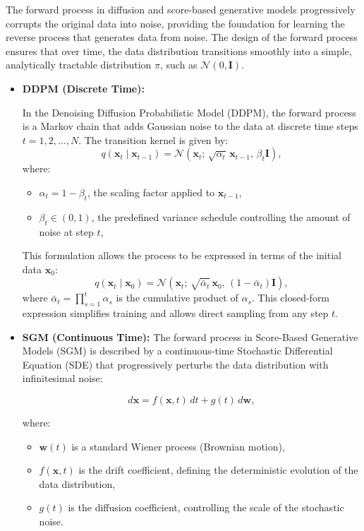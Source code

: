The forward process in diffusion and score-based generative models progressively corrupts the original data into noise, providing the foundation for learning the reverse process that generates data from noise. The design of the forward process ensures that over time, the data distribution transitions smoothly into a simple, analytically tractable distribution $\pi$, such as \( \mathcal{N}(0, \mathbf{I}) \).

\begin{itemize}
    \item \textbf{DDPM (Discrete Time):}
    
    In the Denoising Diffusion Probabilistic Model (DDPM), the forward process is a Markov chain that adds Gaussian noise to the data at discrete time steps \( t = 1, 2, \dots, N \). The transition kernel is given by:
    \[
    q(\mathbf{x}_t \mid \mathbf{x}_{t-1}) = \mathcal{N}\left(\mathbf{x}_t;\, \sqrt{\alpha_t} \, \mathbf{x}_{t-1},\, \beta_t \mathbf{I}\right),
    \]
    where:
    \begin{itemize}
        \item \( \alpha_t = 1 - \beta_t \), the scaling factor applied to \( \mathbf{x}_{t-1} \),
        \item \( \beta_t \in (0, 1) \), the predefined variance schedule controlling the amount of noise at step \( t \),
    \end{itemize}
    This formulation allows the process to be expressed in terms of the initial data \( \mathbf{x}_0 \):
    \[
    q(\mathbf{x}_t \mid \mathbf{x}_0) = \mathcal{N}\left(\mathbf{x}_t;\, \sqrt{\bar{\alpha}_t} \, \mathbf{x}_0,\, (1 - \bar{\alpha}_t) \mathbf{I}\right),
    \]
    where \( \bar{\alpha}_t = \prod_{s=1}^t \alpha_s \) is the cumulative product of \( \alpha_s \). This closed-form expression simplifies training and allows direct sampling from any step \( t \).

    \item \textbf{SGM (Continuous Time):} The forward process in Score-Based Generative Models (SGM) is described by a continuous-time Stochastic Differential Equation (SDE) that progressively perturbs the data distribution with infinitesimal noise:

    \[
    d\mathbf{x} = f(\mathbf{x}, t) \, dt + g(t) \, d\mathbf{w},
    \]
    
    where:
    \begin{itemize}
        \item \( \mathbf{w}(t) \) is a standard Wiener process (Brownian motion),
        \item \( f(\mathbf{x}, t) \) is the drift coefficient, defining the deterministic evolution of the data distribution,
        \item \( g(t) \) is the diffusion coefficient, controlling the scale of the stochastic noise.
    \end{itemize}
    

\end{itemize}
